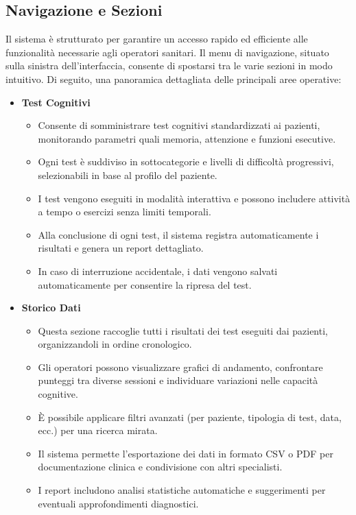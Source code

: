 \documentclass[a4paper,12pt]{book}
\begin{document}
	\subsection{Navigazione e Sezioni}
	Il sistema è strutturato per garantire un accesso rapido ed efficiente alle funzionalità necessarie agli operatori sanitari. Il menu di navigazione, situato sulla sinistra dell’interfaccia, consente di spostarsi tra le varie sezioni in modo intuitivo. Di seguito, una panoramica dettagliata delle principali aree operative:
	
	\begin{itemize}
		\item \textbf{Test Cognitivi}
		\begin{itemize}
			\item Consente di somministrare test cognitivi standardizzati ai pazienti, monitorando parametri quali memoria, attenzione e funzioni esecutive.
			\item Ogni test è suddiviso in sottocategorie e livelli di difficoltà progressivi, selezionabili in base al profilo del paziente.
			\item I test vengono eseguiti in modalità interattiva e possono includere attività a tempo o esercizi senza limiti temporali.
			\item Alla conclusione di ogni test, il sistema registra automaticamente i risultati e genera un report dettagliato.
			\item In caso di interruzione accidentale, i dati vengono salvati automaticamente per consentire la ripresa del test.
		\end{itemize}
		
		\item \textbf{Storico Dati}
		\begin{itemize}
			\item Questa sezione raccoglie tutti i risultati dei test eseguiti dai pazienti, organizzandoli in ordine cronologico.
			\item Gli operatori possono visualizzare grafici di andamento, confrontare punteggi tra diverse sessioni e individuare variazioni nelle capacità cognitive.
			\item È possibile applicare filtri avanzati (per paziente, tipologia di test, data, ecc.) per una ricerca mirata.
			\item Il sistema permette l’esportazione dei dati in formato CSV o PDF per documentazione clinica e condivisione con altri specialisti.
			\item I report includono analisi statistiche automatiche e suggerimenti per eventuali approfondimenti diagnostici.
		\end{itemize}
		

\end{itemize}
\end{document}

